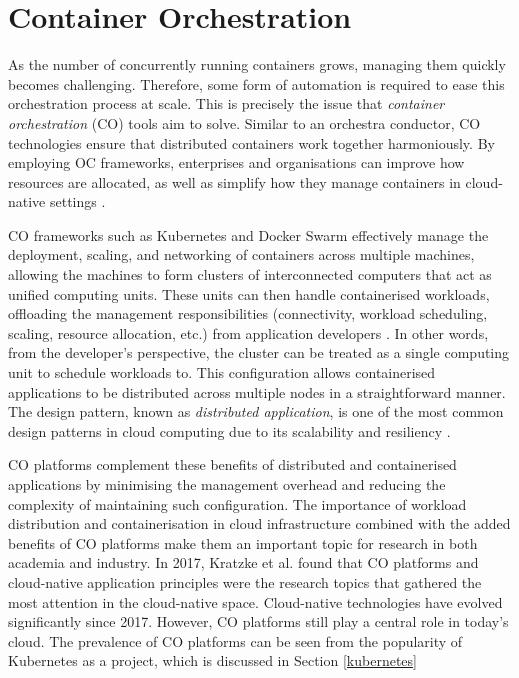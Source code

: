 \section{Container Orchestration}

As the number of concurrently running containers grows, managing them quickly becomes challenging. Therefore, some form of automation is required to ease this orchestration process at scale. This is precisely the issue that \textit{container orchestration} (CO) tools aim to solve. Similar to an orchestra conductor, CO technologies ensure that distributed containers work together harmoniously. By employing OC frameworks, enterprises and organisations can improve how resources are allocated, as well as simplify how they manage containers in cloud-native settings \cite{truyenComprehensiveFeatureComparison2019}.

CO frameworks such as Kubernetes and Docker Swarm effectively manage the deployment, scaling, and networking of containers across multiple machines, allowing the machines to form clusters of interconnected computers that act as unified computing units. These units can then handle containerised workloads, offloading the management responsibilities (connectivity, workload scheduling, scaling, resource allocation, etc.) from application developers \cite{Nodes, UsingMinikubeCreate}. In other words, from the developer's perspective, the cluster can be treated as a single computing unit to schedule workloads to. This configuration allows containerised applications to be distributed across multiple nodes in a straightforward manner. The design pattern, known as \textit{distributed application}, is one of the most common design patterns in cloud computing due to its scalability and resiliency \cite{fehling2014cloud,kratzkeUnderstandingCloudnativeApplications2017}.

CO platforms complement these benefits of distributed and containerised applications by minimising the management overhead and reducing the complexity of maintaining such configuration. The importance of workload distribution and containerisation in cloud infrastructure combined with the added benefits of CO platforms make them an important topic for research in both academia and industry. In 2017, Kratzke et al. \cite{kratzkeUnderstandingCloudnativeApplications2017} found that CO platforms and cloud-native application principles were the research topics that gathered the most attention in the cloud-native space. Cloud-native technologies have evolved significantly since 2017. However, CO platforms still play a central role in today's cloud. The prevalence of CO platforms can be seen from the popularity of Kubernetes as a project, which is discussed in Section \ref{kubernetes}


